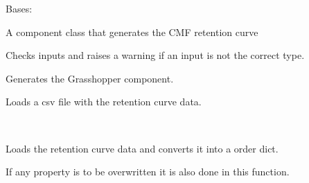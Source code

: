 \documentclass[letterpaper,10pt,english]{sphinxmanual}
\begin{document}
\begin{fulllineitems}
\label{\detokenize{cmf:livestock.components.comp_cmf.CMFRetentionCurve}}
Bases: {\hyperref[\detokenize{superclass:livestock.components.component.GHComponent}]{}}

A component class that generates the CMF retention curve

\begin{fulllineitems}
\label{\detokenize{cmf:livestock.components.comp_cmf.CMFRetentionCurve.check_inputs}}
Checks inputs and raises a warning if an input is not the correct type.

\end{fulllineitems}


\begin{fulllineitems}
\label{\detokenize{cmf:livestock.components.comp_cmf.CMFRetentionCurve.config}}
Generates the Grasshopper component.

\end{fulllineitems}


\begin{fulllineitems}
\label{\detokenize{cmf:livestock.components.comp_cmf.CMFRetentionCurve.load_csv}}
Loads a csv file with the retention curve data.

\end{fulllineitems}


\begin{fulllineitems}
\label{\detokenize{cmf:livestock.components.comp_cmf.CMFRetentionCurve.load_retention_curve}}~
\begin{DUlineblock}{0em}
\item[] Loads the retention curve data and converts it into a order dict.
\item[] If any property is to be overwritten it is also done in this function.
\end{DUlineblock}


\end{fulllineitems}
\end{fulllineitems}
\end{document}
